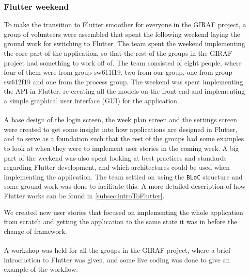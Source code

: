 \subsubsection{Flutter weekend}
To make the transition to Flutter smoother for everyone in the GIRAF project, a group of volunteers were assembled that spent the following weekend laying the ground work for switching to Flutter. 
The team spent the weekend implementing the core part of the application, so that the rest of the groups in the GIRAF project had something to work off of. 
The team consisted of eight people, where four of them were from group sw611f19, two from our group, one from group sw612f19 and one from the process group.
The weekend was spent implementing the API in Flutter, re-creating all the models on the front end and implementing a simple graphical user interface (GUI) for the application.
\\\\
A base design of the login screen, the week plan screen and the settings screen were created to get some insight into how applications are designed in Flutter, and to serve as a foundation such that the rest of the groups had some examples to look at when they were to implement user stories in the coming week.
A big part of the weekend was also spent looking at best practices and standards regarding Flutter development, and which architectures could be used when implementing the application.
The team settled on using the \texttt{BLoC} structure and some ground work was done to facilitate this.
A more detailed description of how Flutter works can be found in \autoref{subsec:introToFlutter}.

We created new user stories that focused on implementing the whole application from scratch and getting the application to the same state it was in before the change of framework.
\\\\
A workshop was held for all the groups in the GIRAF project, where a brief introduction to Flutter was given, and some live coding was done to give an example of the workflow.

